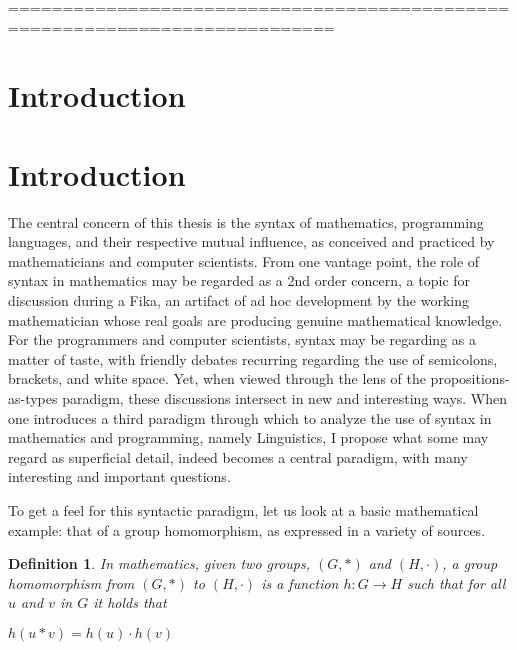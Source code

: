 \documentclass[11pt, a4paper]{article}
\newtheorem{definition}{Definition} \newtheorem{lem}{Lemma}
\begin{document}
\begin{spacing}{0.0}
\tableofcontents
\end{spacing}

\thispagestyle{empty}

============================================================================
\newpage \setcounter{page}{1}

\section{Introduction}
\label{sec:intro}

\section{Introduction}

The central concern of this thesis is the syntax of mathematics, programming
languages, and their respective mutual influence, as conceived and practiced by
mathematicians and computer scientists. From one vantage point, the role of
syntax in mathematics may be regarded as a 2nd order concern, a topic for
discussion during a Fika, an artifact of ad hoc development by the working
mathematician whose real goals are producing genuine mathematical knowledge. For
the programmers and computer scientists, syntax may be regarding as a matter of
taste, with friendly debates recurring regarding the use of semicolons,
brackets, and white space. Yet, when viewed through the lens of the
propositions-as-types paradigm, these discussions intersect in new and
interesting ways. When one introduces a third paradigm through which to analyze
the use of syntax in mathematics and programming, namely Linguistics, I propose
what some may regard as superficial detail, indeed becomes a central paradigm,
with many interesting and important questions.

To get a feel for this syntactic paradigm, let us look at a basic mathematical
example: that of a group homomorphism, as expressed in a variety of sources.


\begin{definition} In mathematics, given two groups, $(G, \ast)$ and $(H,
\cdot)$, a group homomorphism from $(G, \ast)$ to $(H, \cdot)$ is a function $h
: G \to H$ such that for all $u$ and $v$ in $G$ it holds that

\begin{center} $h(u \ast v) = h ( u ) \cdot h ( v )$
\end{center}
\end{definition}
\end{document}
